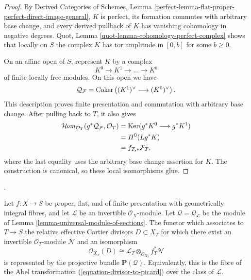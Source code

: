 \begin{proof}
By Derived Categories of Schemes, Lemma
\ref{perfect-lemma-flat-proper-perfect-direct-image-general}, $K$ is perfect,
its formation commutes with arbitrary base change, and every derived pullback
of $K$ has vanishing cohomology in negative degrees. Quot, Lemma
\ref{quot-lemma-cohomology-perfect-complex} shows that locally on $S$ the
complex $K$ has tor amplitude in $[0, b]$ for some $b \geq 0$.

On an affine open of $S$, represent $K$ by a complex
$$
K^0 \longrightarrow K^1 \longrightarrow \ldots \longrightarrow K^b
$$
of finite locally free modules. On this open we have
$$
\mathcal{Q}_{\mathcal{F}} =
\mathop{\mathrm{Coker}}\left((K^1)^\vee \longrightarrow (K^0)^\vee\right).
$$
This description proves finite presentation and commutation with arbitrary
base change. After pulling back to $T$, it also gives
\begin{align*}
\mathop{\mathcal{H}\!\mathit{om}}\nolimits_{\mathcal{O}_T}(g^*\mathcal{Q}_{\mathcal{F}}, \mathcal{O}_T)
& = \mathop{\mathrm{Ker}}(g^*K^0 \longrightarrow g^*K^1) \\
& = H^0(Lg^*K) \\
& = f_{T, *}\mathcal{F}_T,
\end{align*}
where the last equality uses the arbitrary base change assertion for $K$.
The construction is canonical, so these local isomorphisms glue.
\end{proof}




\begin{theorem}
\label{theorem-complete-linear-system}
\begin{reference}
\cite[Expos\'e 232, Theorem 4.3, p. 153]{FGA}.
\end{reference}
Let $f : X \to S$ be proper, flat, and of finite presentation with
geometrically integral fibres, and let $\mathcal{L}$ be an invertible
$\mathcal{O}_X$-module. Let $\mathcal{Q} =
\mathcal{Q}_{\mathcal{L}}$ be the module of Lemma
\ref{lemma-universal-module-of-sections}. The functor which associates to
$T \to S$ the relative effective Cartier divisors $D \subset X_T$ for which
there exist an invertible $\mathcal{O}_T$-module $\mathcal{N}$ and an
isomorphism
$$
\mathcal{O}_{X_T}(D) \cong
\mathcal{L}_T \otimes_{\mathcal{O}_{X_T}} f_T^*\mathcal{N}
$$
is represented by the projective bundle $\mathbf{P}(\mathcal{Q})$.
Equivalently, this is the fibre of the Abel transformation
(\ref{equation-divisor-to-picard}) over the class of $\mathcal{L}$.
\end{theorem}


